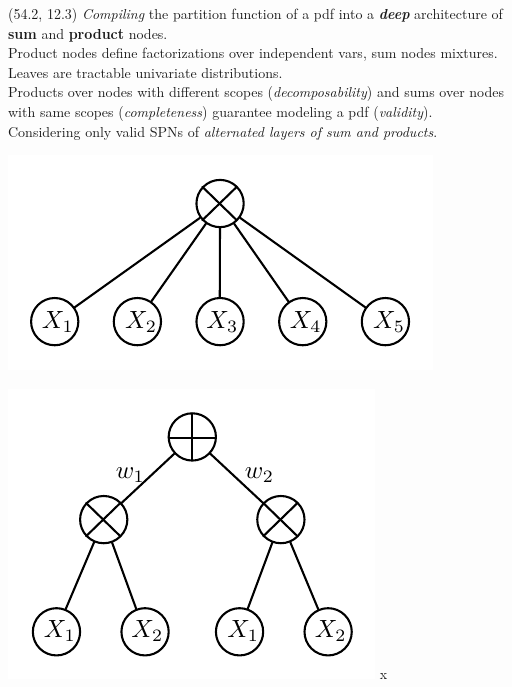 \documentclass[final]{beamer}
\begin{document}
\begin{frame}{}
\begin{textblock}{25.7}
    
  \end{textblock}
  
  \begin{textblock}{25.7}(54.2, 12.3)
    \small
    \emph{Compiling} the partition function of a pdf into a \textbf{\emph{deep}} architecture of \textbf{sum}
    and \textbf{product} nodes.\\
    
    Product nodes define factorizations over independent vars, sum
    nodes mixtures. Leaves are tractable univariate distributions.\\
    
    
    Products over nodes with different scopes (\emph{decomposability}) and
    sums over nodes with same scopes (\emph{completeness}) guarantee modeling
    a pdf (\emph{validity}).\\
    
    Considering only valid SPNs of \emph{alternated layers of sum and
      products}.
    
    \begin{minipage}{0.45\linewidth}
      \centering
      \includegraphics[width=0.8\linewidth]{figures/spn-prod}
    \end{minipage}\begin{minipage}{0.45\linewidth}
      \centering
      \includegraphics[width=0.7\linewidth]{figures/spn-sum}
x    \end{minipage}



\end{textblock}
\end{frame}
\end{document}
